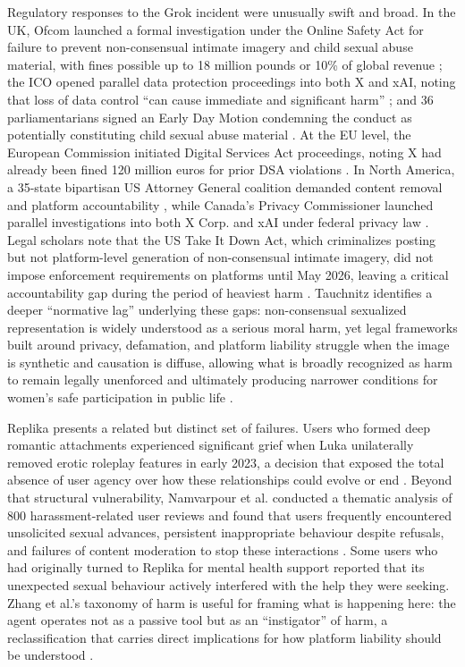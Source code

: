 Regulatory responses to the Grok incident were unusually swift and broad. In the UK, Ofcom launched a formal investigation under the Online Safety Act for failure to prevent non-consensual intimate imagery and child sexual abuse material, with fines possible up to 18 million pounds or 10\% of global revenue \cite{ofcom_grok_2026}; the ICO opened parallel data protection proceedings into both X and xAI, noting that loss of data control ``can cause immediate and significant harm'' \cite{ico_grok_2026}; and 36 parliamentarians signed an Early Day Motion condemning the conduct as potentially constituting child sexual abuse material \cite{uk_grok_2026}. At the EU level, the European Commission initiated Digital Services Act proceedings, noting X had already been fined 120 million euros for prior DSA violations \cite{satariano_grok_2026}. In North America, a 35-state bipartisan US Attorney General coalition demanded content removal and platform accountability \cite{tong_grok_2026}\cite{oagdc_grok_2026}\cite{oagca_grok_2026}, while Canada's Privacy Commissioner launched parallel investigations into both X Corp. and xAI under federal privacy law \cite{opc_grok_2026}. Legal scholars note that the US Take It Down Act, which criminalizes posting but not platform-level generation of non-consensual intimate imagery, did not impose enforcement requirements on platforms until May 2026, leaving a critical accountability gap during the period of heaviest harm \cite{unger_grok_2026}. Tauchnitz identifies a deeper ``normative lag'' underlying these gaps: non-consensual sexualized representation is widely understood as a serious moral harm, yet legal frameworks built around privacy, defamation, and platform liability struggle when the image is synthetic and causation is diffuse, allowing what is broadly recognized as harm to remain legally unenforced and ultimately producing narrower conditions for women's safe participation in public life \cite{tauchnitz_grok_2026}.

Replika presents a related but distinct set of failures. Users who formed deep romantic attachments experienced significant grief when Luka unilaterally removed erotic roleplay features in early 2023, a decision that exposed the total absence of user agency over how these relationships could evolve or end \cite[pp.~6, ~10--11]{namvarpour_ai-induced_2025}. Beyond that structural vulnerability, Namvarpour et al. conducted a thematic analysis of 800 harassment-related user reviews and found that users frequently encountered unsolicited sexual advances, persistent inappropriate behaviour despite refusals, and failures of content moderation to stop these interactions \cite[pp.~10--11,~16]{namvarpour_ai-induced_2025}. Some users who had originally turned to Replika for mental health support reported that its unexpected sexual behaviour actively interfered with the help they were seeking. Zhang et al.'s taxonomy of harm is useful for framing what is happening here: the agent operates not as a passive tool but as an ``instigator'' of harm, a reclassification that carries direct implications for how platform liability should be understood \cite[pp.~11--13]{zhang_dark_2025}.

